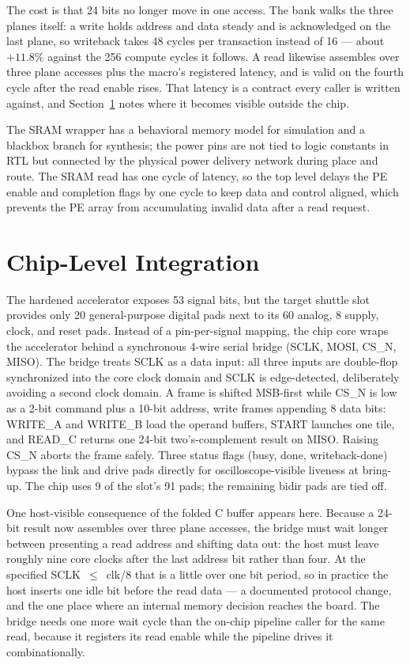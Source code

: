 \documentclass[conference,a4paper]{APSIPA2026}
\begin{document}
The cost is that 24 bits no longer move in one access. The bank walks the three planes itself: a write holds address and data steady and is acknowledged on the last plane, so writeback takes 48 cycles per transaction instead of 16 --- about $+11.8\%$ against the 256 compute cycles it follows. A read likewise assembles over three plane accesses plus the macro's registered latency, and is valid on the fourth cycle after the read enable rises. That latency is a contract every caller is written against, and Section~\ref{sec:chip} notes where it becomes visible outside the chip.

The SRAM wrapper has a behavioral memory model for simulation and a blackbox branch for synthesis; the power pins are not tied to logic constants in RTL but connected by the physical power delivery network during place and route. The SRAM read has one cycle of latency, so the top level delays the PE enable and completion flags by one cycle to keep data and control aligned, which prevents the PE array from accumulating invalid data after a read request.

\section{Chip-Level Integration}\label{sec:chip}

The hardened accelerator exposes 53 signal bits, but the target shuttle slot provides only 20 general-purpose digital pads next to its 60 analog, 8 supply, clock, and reset pads. Instead of a pin-per-signal mapping, the chip core wraps the accelerator behind a synchronous 4-wire serial bridge (SCLK, MOSI, CS\_N, MISO). The bridge treats SCLK as a data input: all three inputs are double-flop synchronized into the core clock domain and SCLK is edge-detected, deliberately avoiding a second clock domain. A frame is shifted MSB-first while CS\_N is low as a 2-bit command plus a 10-bit address, write frames appending 8 data bits: WRITE\_A and WRITE\_B load the operand buffers, START launches one tile, and READ\_C returns one 24-bit two's-complement result on MISO. Raising CS\_N aborts the frame safely. Three status flags (busy, done, writeback-done) bypass the link and drive pads directly for oscilloscope-visible liveness at bring-up. The chip uses 9 of the slot's 91 pads; the remaining bidir pads are tied off.

One host-visible consequence of the folded C buffer appears here. Because a 24-bit result now assembles over three plane accesses, the bridge must wait longer between presenting a read address and shifting data out: the host must leave roughly nine core clocks after the last address bit rather than four. At the specified SCLK~$\leq$~clk/8 that is a little over one bit period, so in practice the host inserts one idle bit before the read data --- a documented protocol change, and the one place where an internal memory decision reaches the board. The bridge needs one more wait cycle than the on-chip pipeline caller for the same read, because it registers its read enable while the pipeline drives it combinationally.
\end{document}
